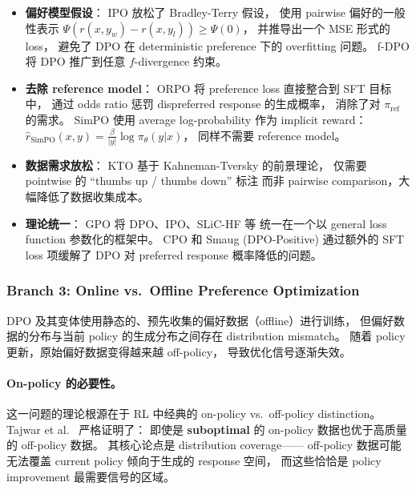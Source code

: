 \begin{itemize}[leftmargin=2em]
  \item \textbf{偏好模型假设}：
    IPO \cite{azar2023ipo} 放松了 Bradley-Terry 假设，
    使用 pairwise 偏好的一般性表示
    $\Psi(r(x, y_w) - r(x, y_l)) \geq \Psi(0)$，
    并推导出一个 MSE 形式的 loss，
    避免了 DPO 在 deterministic preference 下的 overfitting 问题。
    f-DPO \cite{wang2023fdpo} 将 DPO 推广到任意 $f$-divergence 约束。

  \item \textbf{去除 reference model}：
    ORPO \cite{hong2024orpo} 将 preference loss 直接整合到 SFT 目标中，
    通过 odds ratio 惩罚 dispreferred response 的生成概率，
    消除了对 $\pi_{\text{ref}}$ 的需求。
    SimPO \cite{meng2024simpo} 使用 average log-probability 作为 implicit reward：
    $\hat{r}_{\text{SimPO}}(x, y) = \frac{\beta}{|y|} \log \pi_\theta(y|x)$，
    同样不需要 reference model。

  \item \textbf{数据需求放松}：
    KTO \cite{ethayarajh2024kto} 基于 Kahneman-Tversky 的前景理论，
    仅需要 pointwise 的 ``thumbs up / thumbs down'' 标注
    而非 pairwise comparison，大幅降低了数据收集成本。

  \item \textbf{理论统一}：
    GPO \cite{tang2024gpo} 将 DPO、IPO、SLiC-HF \cite{zhao2023slic} 等
    统一在一个以 general loss function 参数化的框架中。
    CPO \cite{xu2024cpo} 和 Smaug (DPO-Positive) \cite{pal2024smaug}
    通过额外的 SFT loss 项缓解了 DPO 对 preferred response 概率降低的问题。
\end{itemize}


\subsubsection{Branch 3: Online vs.\ Offline Preference Optimization}
\label{sec:t2-online-offline}

\begin{problembox}
DPO 及其变体使用静态的、预先收集的偏好数据（offline）进行训练，
但偏好数据的分布与当前 policy 的生成分布之间存在 distribution mismatch。
随着 policy 更新，原始偏好数据变得越来越 off-policy，
导致优化信号逐渐失效。
\end{problembox}

\paragraph{On-policy 的必要性。}
这一问题的理论根源在于 RL 中经典的 on-policy vs.\ off-policy distinction。
Tajwar et al.\ \cite{tajwar2024onpolicy} 严格证明了：
即使是 \textbf{suboptimal} 的 on-policy 数据也优于高质量的 off-policy 数据。
其核心论点是 distribution coverage——
off-policy 数据可能无法覆盖 current policy 倾向于生成的 response 空间，
而这些恰恰是 policy improvement 最需要信号的区域。

